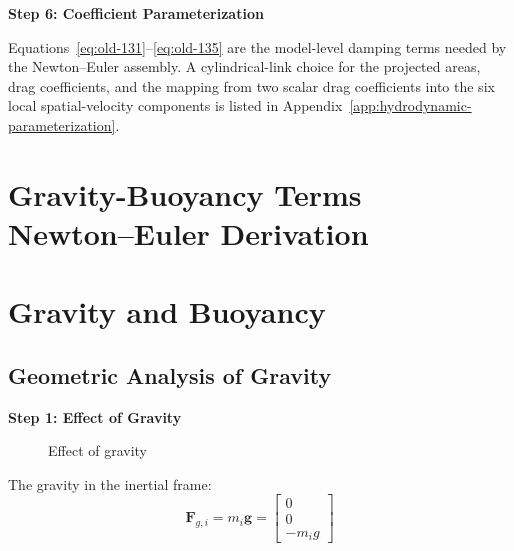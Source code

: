 \documentclass[12pt,a4paper]{report}
\begin{document}
\textbf{Step 6: Coefficient Parameterization}

Equations~\eqref{eq:old-131}--\eqref{eq:old-135} are the model-level damping terms needed by the Newton--Euler assembly. A cylindrical-link choice for the projected areas, drag coefficients, and the mapping from two scalar drag coefficients into the six local spatial-velocity components is listed in Appendix~\ref{app:hydrodynamic-parameterization}.

\section[Gravity-Buoyancy Terms]{Gravity-Buoyancy Terms\\ Newton--Euler Derivation}

\section{Gravity and Buoyancy}

\subsection{Geometric Analysis of Gravity}

\textbf{Step 1: Effect of Gravity}

\begin{figure}[H]
\centering
{}
\caption{Effect of gravity}
\end{figure}

The gravity in the inertial frame:
\begin{equation}
\mathbf{F}_{g,i} = m_i \mathbf{g} = \begin{bmatrix} 0 \\ 0 \\ -m_i g \end{bmatrix}
\label{eq:old-137}
\end{equation}
\end{document}
